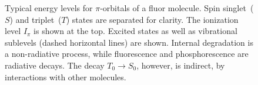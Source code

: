 \documentclass{article}
\begin{document}
\begin{figure}
\begin{sansmath}
\end{sansmath}

\caption{Typical energy levels for $\pi$-orbitals of a fluor molecule.
Spin singlet~($S$) and triplet~($T$) states are separated for clarity. The
ionization level $I_\pi$ is shown at the top.  Excited states as well as
vibrational sublevels (dashed horizontal lines) are shown.  Internal
degradation is a non-radiative process, while fluorescence and
phosphorescence are radiative decays.  The decay $T_0 \to S_0$, however,
is indirect, by interactions with other molecules.}
\end{figure}
\end{document}
